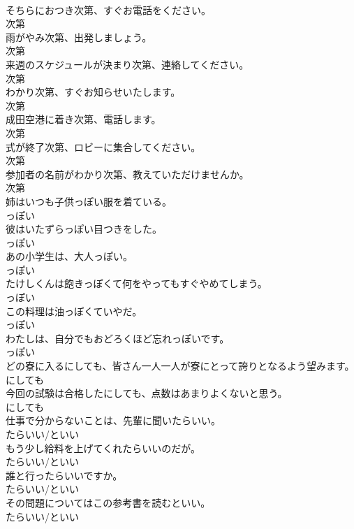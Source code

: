 \documentclass[8pt]{extreport}
\begin{document}
\begin{CJK}{UTF8}{min}
\\	そちらにおつき次第、すぐお電話をください。	
\\	次第	
\\	雨がやみ次第、出発しましょう。	
\\	次第	
\\	来週のスケジュールが決まり次第、連絡してください。	
\\	次第	
\\	わかり次第、すぐお知らせいたします。	
\\	次第	
\\	成田空港に着き次第、電話します。	
\\	次第	
\\	式が終了次第、ロビーに集合してください。	
\\	次第	
\\	参加者の名前がわかり次第、教えていただけませんか。	
\\	次第	
\\	姉はいつも子供っぽい服を着ている。	
\\	っぽい	
\\	彼はいたずらっぽい目つきをした。	
\\	っぽい	
\\	あの小学生は、大人っぽい。	
\\	っぽい	
\\	たけしくんは飽きっぽくて何をやってもすぐやめてしまう。	
\\	っぽい	
\\	この料理は油っぽくていやだ。	
\\	っぽい	
\\	わたしは、自分でもおどろくほど忘れっぽいです。	
\\	っぽい	
\\	どの寮に入るにしても、皆さん一人一人が寮にとって誇りとなるよう望みます。	
\\	にしても	
\\	今回の試験は合格したにしても、点数はあまりよくないと思う。	
\\	にしても	
\\	仕事で分からないことは、先輩に聞いたらいい。	
\\	たらいい/といい	
\\	もう少し給料を上げてくれたらいいのだが。	
\\	たらいい/といい	
\\	誰と行ったらいいですか。	
\\	たらいい/といい	
\\	その問題についてはこの参考書を読むといい。	
\\	たらいい/といい	

\end{CJK}
\end{document}
